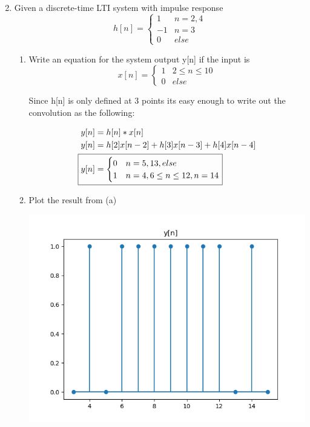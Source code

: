 \documentclass{article}
\begin{document}
\begin{enumerate}
\begin{enumerate}
\begin{align}
        \end{align}
    \end{enumerate}
    \newpage
    \item Given a discrete-time LTI system with impulse response
    \begin{equation}
        h[n] = \begin{cases}
        1 & n=2,4\\
        -1 & n=3\\
        0 & else
        \end{cases}
    \end{equation}
    \begin{enumerate}
        \item Write an equation for the system output y[n] if the input is
        \begin{equation}
            x[n] = \begin{cases}
            1 & 2 \leq n \leq 10\\
            0 & else
            \end{cases}
        \end{equation}
        \begin{center}
            Since h[n] is only defined at 3 points its easy enough to write out the convolution as the following:
        \end{center}
        \begin{align}
            y[n] &= h[n] * x[n]\\
            y[n] &= h[2]x[n-2]+h[3]x[n-3]+h[4]x[n-4]\\
            \Aboxed{y[n] &= {\begin{cases}
                    0 & n=5, 13, else \\
                    1 & n=4, 6 \leq n \leq 12, n=14
                    \end{cases}}}
        \end{align}
        \item Plot the result from (a)
        \begin{center}
            \includegraphics[width = .5\textwidth]{conv.png}

\end{center}
\end{enumerate}
\end{enumerate}
\end{document}
